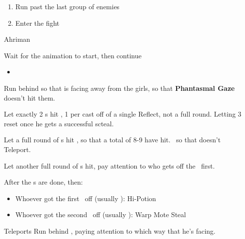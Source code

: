 \begin{menu}
\party{\vaan}
\end{menu}
\begin{enumerate}[resume]
\optimize{\vaan}
\item Run past the last group of enemies
\gambiton{\vaan}
\item Enter the fight
\end{enumerate}
\begin{battle}{Ahriman}
\begin{itemize}
	{
		\item Wait for the animation to start, then continue
	}
\begin{menu}
\begin{itemize}
\girlsin
\item \GirlsGambitOn
\end{itemize}
\end{menu}
\vaanf Run behind  so that  is facing away from the girls, so that \textbf{Phantasmal Gaze} doesn't hit them.
\item Let exactly 2 \fira s hit , 1 per cast off of a single Reflect, not a full round. Letting 3 reset
\atbresetgirls
\battlewait
\gambitoff{\vaan} once he gets a successful scteal.
\item Let a full round of \fira s hit , so that a total of 8-9 have hit.
\beliasfreeze\ so that  doesn't Teleport.
\item Let another full round of \fira s hit, pay attention to who gets off the \fira\ first.
\item After the \fira s are done, then:
\begin{itemize}
\item Whoever got the first \fira\ off (usually \penelo): Hi-Potion 
\item Whoever got the second \fira\ off (usually \ashe): Warp Mote
\vaanf Steal 
\end{itemize}
\item {} Teleports
\vaanf Run behind , paying attention to which way that he's facing.
\begin{menu}
\begin{itemize}
\girlsout
{}
\end{itemize}

\end{menu}
\end{itemize}
\end{battle}

